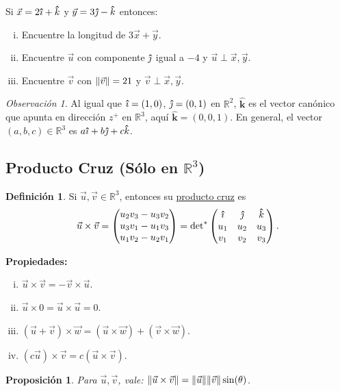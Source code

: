 \documentclass[12pt]{article}
\theoremstyle{plain}
\newtheorem{Prop}[Th]{Proposición}     %
\theoremstyle{definition}
\newtheorem*{Def}{Definición}       %
\theoremstyle{remark}
\newtheorem*{Rmk}{Observación}      %
\newcommand{\bR}{\mathbb{R}}        %
\newcommand{\x}{\times}             %
\renewcommand{\:}{\colon}           %
\newcommand{\un}[1]{\underline{#1}}
\renewcommand{\.}{\Cdot}                %
\newcommand{\threebyone}[3]{\begin{pmatrix} %
  #1 \\ #2 \\ #3 \end{pmatrix}}
\newcommand{\threebythree}[9]{\begin{pmatrix} %
  #1 & #2 & #3 \\ #4 & #5 & #6 \\ #7 & #8 & #9 \end{pmatrix}}
\newcommand{\thickhat}[1]{\mathbf{\hat{\text{$#1$}}}}
\newcommand{\ii}{\vu{\imath}}
\newcommand{\jj}{\vu{\jmath}}
\newcommand{\kk}{\thickhat{k}}
\begin{document}
\begin{multicols}{2}
\begin{center}
\begin{tikzpicture}[x=0.75pt,y=0.75pt,yscale=-1,xscale=1]
  
  \end{tikzpicture}
  
\end{center}

\begin{ptcbP}
  Si $\vec{x}=2\vu{\imath}+\thickhat{k}$ y $\vec{y}=3\vu{\jmath}-\thickhat{k}$ entonces:
  \vspace{-0.35em}
  \begin{enumerate}[i)]
    \itemsep=-0.35em
    \item Encuentre la longitud de $3\vec{x}+\vec{y}$.
    \item Encuentre $\vec{u}$ con componente $\jj$ igual a $-4$ y $\vec{u}\perp \vec{x},\vec{y}$.
    \item Encuentre $\vec{v}$ con $\norm{\vec{v}}=21$ y $\vec{v}\perp \vec{x},\vec{y}$.
  \end{enumerate}
\end{ptcbP}

\begin{Rmk}
Al igual que $\ii=(1,0)$, $\jj=(0,1)$ en $\bR^2$, $\kk$ es el vector canónico que apunta en dirección $z^+$ en $\bR^3$, aquí $\kk=(0,0,1)$. En general, el vector $(a,b,c)\in\bR^3$ es $a\ii+b\jj+c\kk$. 
\end{Rmk}

\subsection*{Producto Cruz (Sólo en $\bR^3$)}

\begin{Def}
  Si $\vec u,\vec v\in\bR^3$, entonces su \un{producto cruz} es 
  $$\vec u\x\vec v=\threebyone{u_2v_3-u_3v_2}{u_3v_1-u_1v_3}{u_1v_2-u_2v_1}=\text{det}^\ast\threebythree{\ii}{\jj}{\kk}{u_1}{u_2}{u_3}{v_1}{v_2}{v_3}.$$
\end{Def}

\textbf{Propiedades:}
\begin{enumerate}[i)]
  \itemsep=-0.4em
  \item  $\vec u\x\vec v=-\vec v\x\vec u$.
  \item  $\vec u\x 0=\vec u\x\vec u=0$.
  \item  $(\vec u+\vec v)\x\vec w=(\vec u\x \vec w)+(\vec v\x \vec w)$.
  \item $(c\vec u)\x\vec v=c(\vec{u}\x\vec v)$.
\end{enumerate}

\begin{Prop}
  Para $\vec{u},\vec v$, vale: \un{$\norm{\vec{u}\x\vec{v}}=\norm{\vec{u}}\norm{\vec v}\sin(\theta)$}.
\end{Prop}


\end{multicols}
\end{document}
